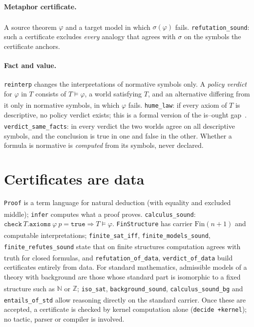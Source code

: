 \documentclass[11pt]{article}
\newcommand{\thm}[1]{\texttt{#1}}
\newcommand{\ok}{\textsuperscript{\checkmark}}
\begin{document}
\paragraph{Metaphor certificate.}
A source theorem $\varphi$ and a target model in which $\sigma(\varphi)$ fails.
\thm{refutation\_sound}\ok: such a certificate excludes \emph{every} analogy that agrees with
$\sigma$ on the symbols the certificate anchors.

\paragraph{Fact and value.}
\texttt{reinterp} changes the interpretations of normative symbols only. A \emph{policy
verdict} for $\varphi$ in $T$ consists of $T \models \varphi$, a world satisfying $T$, and an
alternative differing from it only in normative symbols, in which $\varphi$ fails.
\thm{hume\_law}\ok: if every axiom of $T$ is descriptive, no policy verdict exists; this is a
formal version of the is--ought gap~\cite{hume1739treatise,schurz1997isought}.
\thm{verdict\_same\_facts}\ok: in every verdict the two worlds agree on all descriptive
symbols, and the conclusion is true in one and false in the other. Whether a formula is
normative is \emph{computed} from its symbols, never declared.

\section{Certificates are data}

\texttt{Proof} is a term language for natural deduction (with equality and excluded middle);
\texttt{infer} computes what a proof proves. \thm{calculus\_sound}\ok:
$\texttt{check}\ T.\texttt{axioms}\ \varphi\ p = \texttt{true} \Rightarrow T \models \varphi$.
\texttt{FinStructure} has carrier $\mathrm{Fin}(n{+}1)$ and computable interpretations;
\thm{finite\_sat\_iff}\ok, \thm{finite\_models\_sound}\ok, \thm{finite\_refutes\_sound}\ok{}
state that on finite structures computation agrees with truth for closed formulas, and
\thm{refutation\_of\_data}\ok, \thm{verdict\_of\_data}\ok{} build certificates entirely from
data. For standard mathematics, admissible models of a theory with background are those whose
standard part is isomorphic to a fixed structure such as $\mathbb{N}$ or $\mathbb{Z}$;
\thm{iso\_sat}\ok, \thm{background\_sound}\ok, \thm{calculus\_sound\_bg}\ok{} and
\thm{entails\_of\_std}\ok{} allow reasoning directly on the standard carrier. Once these are
accepted, a certificate is checked by kernel computation alone (\texttt{decide +kernel}); no
tactic, parser or compiler is involved.
\end{document}
